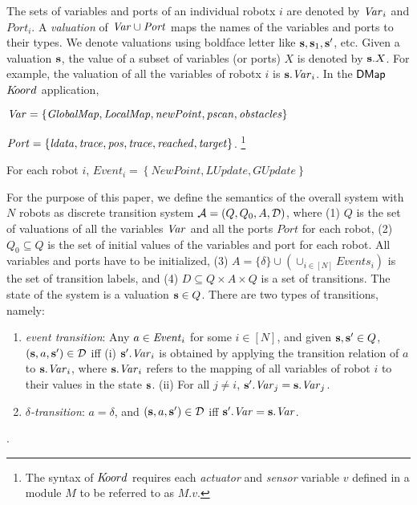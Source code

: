 %
The sets of variables and ports of an individual robotx $i$ are denoted by $\mathit{Var}_i$ and  $\mathit{Port}_i$.
%
A {\em valuation\/} of $\mathit{Var} \cup \mathit{Port}$ maps the names of the variables and ports to their types. 
We denote valuations using boldface letter like ${\textbf{s}}, {\textbf{s}}_1, {\textbf{s}}'$, etc. 
%
Given a valuation ${\textbf{s}}$, the value of a subset of  variables (or ports) $X$ is denoted by ${\textbf{s}}.X$. For example, the  valuation of all the variables of robotx $i$ is ${\textbf{s}}.\mathit{Var}_i$.
%
%
In the ${\sf DMap}$ $K\kern-2pt oord$ application,
\begin{inparaenum}
\item $\mathit{Var} = \left\{ \mathit{GlobalMap}, \mathit{LocalMap}, \mathit{newPoint}, \mathit{pscan}, \mathit{obstacles} \right\}$
\item $\mathit{Port} = \left\{\mathit{ldata}, \mathit{trace}, \mathit{pos}, \mathit{trace}, \mathit{reached}, \mathit{target} \right\}$. \footnote{The syntax of $K\kern-2pt oord$ requires each \emph{actuator} and \emph{sensor} variable $v$ defined in a module $M$ to be referred to as $M.v$.}
\item For each robot $i$, $\mathit{Event}_i = \left\{ \mathit{NewPoint}, \mathit{LUpdate}, \mathit{GUpdate}\right\}$
\end{inparaenum}
%
%
For the purpose of this paper, we define the  semantics of the overall system with $N$ robots as discrete transition system $\mathcal{A} = (Q, Q_0, A, \mathcal{D})$,
where
(1) $Q$ is the set of valuations of all the variables $\mathit{Var}$ and all the ports $\mathit{Port}$ for each robot,
(2) $Q_0 \subseteq Q$ is the set of initial values of the variables and port for each robot. All variables and ports have to be initialized,
(3) $A = \{\delta\} \cup \left( \cup_{i \in [N]} \mathit{Events}_i \right)$ is the set of transition labels, and
(4) $D \subseteq Q \times A \times Q$ is a set of transitions. The state of the system is a valuation ${\textbf{s}} \in Q$. There are two types of transitions, namely:
\begin{enumerate}
	\item {\em event transition}: Any $a \in \mathit{Event}_i$ for some $i \in [N]$, and  given ${\textbf{s}}, {\textbf{s}}'\in Q$,   $({\textbf{s}},a,{\textbf{s}}') \in \mathcal{D}$ iff (i) ${\textbf{s}}'.\mathit{Var}_i$ is obtained by applying the transition relation of $a$ to ${\textbf{s}}.\mathit{Var}_i$, where ${\textbf{s}}.\mathit{Var}_i$ refers to the mapping of all variables of robot $i$ to their values in the state ${\textbf{s}}$.
		(ii) For all $j \neq i$,
		${\textbf{s}}'.\mathit{Var}_j = {\textbf{s}}.\mathit{Var}_j$.
	\item {\em $\delta$-transition}: $a = \delta$, and $({\textbf{s}},a,{\textbf{s}}') \in \mathcal{D}$ iff ${\textbf{s}}'.\mathit{Var} = {\textbf{s}}.\mathit{Var}$.
\end{enumerate}
.


